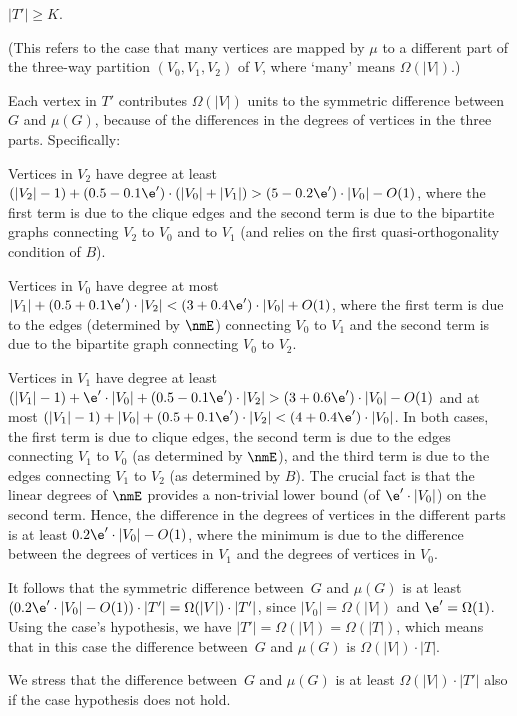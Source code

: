 \BDes
%
\item[{\em Case 1}:] $|T'|\geq K$.

(This refers to the case that many vertices are mapped by $\mu$
to a different part of the three-way partition $(V_0,V_1,V_2)$ of $V$,
where `many' means $\Omega(|V|)$.)

Each vertex in $T'$ contributes $\Omega(|V|)$ units
to the symmetric difference between~$G$ and $\mu(G)$,
because of the differences in the degrees of vertices
in the three parts. Specifically:
\BI
\item Vertices in $V_2$ have degree at least
$(|V_2|-1)+(0.5-0.1\e')\cdot(|V_0|+|V_1|)>(5-0.2\e')\cdot|V_0|-O(1)$,
%
where the first term is due to the clique edges
and the second term is due to the bipartite graphs
connecting $V_2$ to $V_0$ and to $V_1$
(and relies on the first quasi-orthogonality condition of $B$).
\item Vertices in $V_0$ have degree at most
$|V_1|+(0.5+0.1\e')\cdot|V_2|<(3+0.4\e')\cdot|V_0|+O(1)$,
%
where the first term is due to the edges (determined by $\nmE$)
connecting $V_0$ to $V_1$ and the second term is due to
the bipartite graph connecting $V_0$ to $V_2$.
\item
Vertices in $V_1$ have degree at least
$(|V_1|-1)+\e'\cdot|V_0|+(0.5-0.1\e')\cdot|V_2|>(3+0.6\e')\cdot|V_0|-O(1)$
%
and at most
$(|V_1|-1)+|V_0|+(0.5+0.1\e')\cdot|V_2| < (4+0.4\e')\cdot|V_0|$.
%
In both cases, the first term is due to clique edges,
the second term is due to the edges connecting $V_1$ to $V_0$
(as determined by $\nmE$), and the third term is due to
the edges connecting $V_1$ to $V_2$ (as determined by $B$).
The crucial fact is that the linear degrees of $\nmE$ provides
a non-trivial lower bound (of $\e'\cdot|V_0|$) on the second term.
\EI
Hence, the difference in the degrees of vertices in the different
parts is at least $0.2\e'\cdot|V_0|-O(1)$, where the minimum
is due to the difference between the degrees of vertices in $V_1$
and the degrees of vertices in $V_0$.

It follows that the symmetric difference between~$G$ and $\mu(G)$
is at least $(0.2\e'\cdot|V_0|-O(1))\cdot|T'|=\Omega(|V|)\cdot|T'|$,
since $|V_0|=\Omega(|V|)$ and $\e'=\Omega(1)$.
Using the case's hypothesis,
we have $|T'|=\Omega(|V|)=\Omega(|T|)$,
which means that in this case
the difference between~$G$ and $\mu(G)$ is $\Omega(|V|)\cdot|T|$.

We stress that the difference between~$G$ and $\mu(G)$
is at least $\Omega(|V|)\cdot|T'|$
also if the case hypothesis does not hold.

